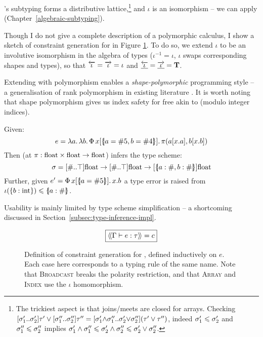 \starr{}'s subtyping forms a distributive lattice,\footnote{The trickiest aspect is that joins/meets are closed for arrays. Checking $\sarraytype{\sigma_1'}{\sigma_2'}{\tau'} \join \sarraytype{\sigma_1''}{\sigma_2''}{\tau''} = \sarraytype{\sigma_1' {\meet} \sigma_1''}{\sigma_2' {\join} \sigma_2''}{(\tau' \join \tau'')}$, indeed $\sigma_1' \leqslant \sigma_2'$ and $\sigma_1'' \leqslant \sigma_2''$ implies $\sigma_1' \land \sigma_1'' \leqslant \sigma_2' \land \sigma_2'' \leqslant \sigma_2' \lor \sigma_2''$.} and $\iota$ is an isomorphism -- we can apply \inference{} (Chapter~\ref{algebraic-subtyping}). 

Though I do not give a complete description of a polymorphic \starr{} calculus, I show a sketch of constraint generation for \starr{} in Figure \ref{fig:star-type-constraints}. To do so, we extend $\iota$ to be an involutive isomorphism in the algebra of types ($\iota^{-1} = \iota$, \ie{} $\iota$ swaps corresponding shapes and types), so that $\overleftarrow{\iota} = \overrightarrow{\iota} = \iota$ and $\underline{\overleftarrow{\iota}} = \underline{\overrightarrow{\iota}} = \mathbf T$.

Extending \starr{} with polymorphism enables a \emph{shape-polymorphic} programming style -- a generalisation of rank polymorphism in existing literature \cite{automap, sac-tensor-comprehensions}. 
It is worth noting that shape polymorphism gives us index safety for free akin to \textcite{theorems-for-free} (modulo integer indices).

\begin{example}
Given:
$$ e = \fllam a \fllam b \sbuild{x}{\sproductval{a = \ssize 5, b = \ssize 4}}{\pi(a[x{.}a], b[x{.}b])} $$
Then \inference{} (at $\pi : \mathrm{float} \times \mathrm{float} \to \mathrm{float}$) infers the type scheme:
$$ \sigma = \sarraytype{\ssized}{\top}{\sfloat} \to \sarraytype{\ssized}{\top}{\sfloat} \to \suniarraytype{\sproducttype{a : \ssized, b : \ssized}}{\sfloat} $$
Further, given $e' = \sbuild{x}{\sproductval{a = \ssize 5}}{x.{b}}$
a type error is raised from $\iota(\srecordtype{b : \sint}) \sub \sproducttype{a : \ssized}$. 

Usability is mainly limited by type scheme simplification -- a shortcoming discussed in Section~\ref{subsec:type-inference-impl}. 
\end{example}

\begin{figure}
    \centering
    \addtolength{\jot}{0.2em}
    $$ \boxed{\cstr{\Gamma}{e}{\tau} = c} $$
    
    \caption{Definition of \inference{} constraint generation for \starr{}, defined inductively on $e$. Each case here corresponds to a typing rule of the same name. Note that \textsc{Broadcast} breaks the polarity restriction, and that \textsc{Array} and \textsc{Index} use the $\iota$ homomorphism.}
    \label{fig:star-type-constraints}
\end{figure}

